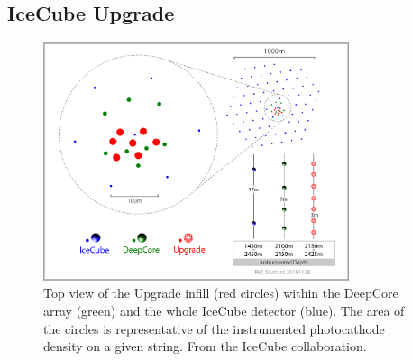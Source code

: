 
\subsection{IceCube Upgrade}
\label{subsec:upgrade}
\begin{figure}[t]
\centering
\includegraphics[width=0.8\textwidth]{chapter5/img/ICUpgradeLayout_V3.jpg}
\caption{Top view of the Upgrade infill (red circles) within the DeepCore array (green) and the whole IceCube detector (blue). The area of the circles is representative of the instrumented photocathode density on a given string. From the IceCube collaboration.}
\label{fig:upgrade}
\end{figure}


